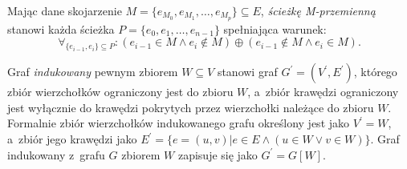 \begin{definition}
  Mając dane skojarzenie ${M=\{e_{M_0}, e_{M_1}, \ldots, e_{M_p}\} \subseteq E}$,
  \emph{ścieżkę M-przemienną} stanowi każda ścieżka $P=\{e_0, e_1, \ldots, e_{n-1}\}$ spełniająca warunek: 
  \[\forall_{\{e_{i-1}, e_i\} \subseteq P}: (e_{i-1} \in M \land e_i \notin M) \oplus  (e_{i-1} \notin M \land e_i \in M).\]
\end{definition}

\begin{definition}
  Graf \emph{indukowany} pewnym zbiorem $W \subseteq V$ stanowi graf $G^\prime=(V^\prime, E^\prime)$, którego zbiór wierzchołków ograniczony jest do zbioru $W$, a~zbiór krawędzi ograniczony jest wyłącznie do krawędzi pokrytych przez wierzchołki należące do zbioru $W$.
  Formalnie zbiór wierzchołków indukowanego grafu określony jest jako $V^\prime = W$, a~zbiór jego krawędzi jako $E^\prime=\{e=(u,v)|e\in E \land (u \in W \lor v \in W)\}$.
  Graf indukowany z~grafu $G$ zbiorem $W$ zapisuje się jako $G^\prime = G[W]$.
\end{definition}
